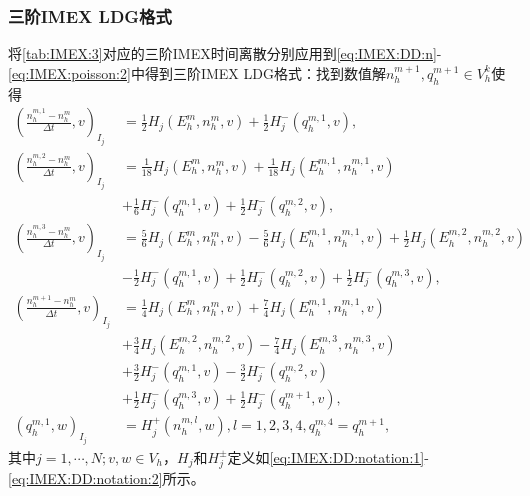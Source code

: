 \subsubsection{三阶IMEX LDG格式}
将\autoref{tab:IMEX:3}对应的三阶IMEX时间离散分别应用到\eqref{eq:IMEX:DD:n}-\eqref{eq:IMEX:poisson:2}中得到三阶IMEX LDG格式：找到数值解$n_h^{m+1}, q_h^{m+1}\in V_h^k$使得
\begin{align}
	(\frac{n_h^{m,1} -n_h^m}{\Delta t},v)_{I_j} & =\frac{1}{2} H_j(E_h^m,n_h^m,v) + \frac{1}{2} H_j^-(q_h^{m,1},v),           \label{eq:IMEX:DD:LDG:1}                       \\
	(\frac{n_h^{m,2} -n_h^m}{\Delta t},v)_{I_j} & = \frac{1}{18} H_j(E_h^m,n_h^m,v) + \frac{1}{18} H_j(E_h^{m,1},n_h^{m,1},v) \nonumber                                      \\
	                                            & + \frac{1}{6} H_j^-(q_h^{m,1},v) + \frac{1}{2} H_j^-(q_h^{m,2},v),                                                         \\
	(\frac{n_h^{m,3} -n_h^m}{\Delta t},v)_{I_j} & =\frac{5}{6} H_j(E_h^m,n_h^m,v) -\frac{5}{6} H_j(E_h^{m,1},n_h^{m,1},v) + \frac{1}{2} H_j(E_h^{m,2},n_h^{m,2},v) \nonumber \\
	                                            & - \frac{1}{2} H_j^-(q_h^{m,1},v) + \frac{1}{2} H_j^-(q_h^{m,2},v) + \frac{1}{2} H_j^-(q_h^{m,3},v),                        \\
	(\frac{n_h^{m+1} -n_h^m}{\Delta t},v)_{I_j} & = \frac{1}{4} H_j(E_h^m,n_h^m,v) +\frac{7}{4} H_j(E_h^{m,1},n_h^{m,1},v)  \nonumber                                        \\
	                                            & + \frac{3}{4} H_j(E_h^{m,2},n_h^{m,2},v) - \frac{7}{4} H_j(E_h^{m,3},n_h^{m,3},v) \nonumber                                \\
	                                            & +\frac{3}{2} H_j^-(q_h^{m,1},v) -\frac{3}{2} H_j^-(q_h^{m,2},v) \nonumber                                                  \\
	                                            & + \frac{1}{2} H_j^-(q_h^{m,3},v)  + \frac{1}{2} H_j^-(q_h^{m+1},v),                                                        \\
	(q_h^{m,1},w)_{I_j}                         & = H_j^+(n_h^{m,l},w), l = 1,2,3,4, q_h^{m,4} = q_h^{m+1},\label{eq:IMEX:DD:LDG:4}
\end{align}
其中$j = 1,\cdots,N;v,w \in V_h$，$H_j$和$H_j^{\pm}$定义如\eqref{eq:IMEX:DD:notation:1}-\eqref{eq:IMEX:DD:notation:2}所示。



